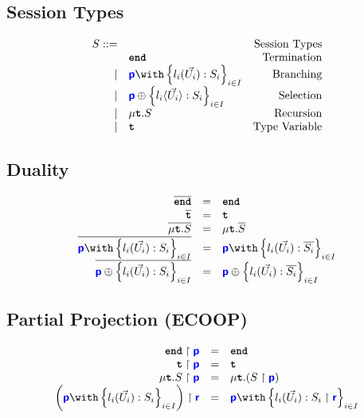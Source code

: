 \documentclass{article}
\begin{document}
\subsection{Session Types}

\doublespacing
\[
\begin{array}{rlr}
    S ::= & & \text{Session Types} \\
     & \tyend & \text{Termination} \\
		\mid & \tybra{p}{l_i(\vec{U_i}): S_i}{i \in I} & \text{Branching} \\
		\mid & \tysel{p}{l_i \langle\vec{U_i}\rangle: S_i}{i \in I} & \text{Selection} \\
		\mid & \tyrec{S} & \text{Recursion} \\
		\mid & \tyrecvar & \text{Type Variable} \\
\end{array}
\]
\singlespacing

\subsection{Duality}
\doublespacing
\[
\begin{array}{rcl}
		\dual{\tyend} & = & \tyend \\
		\dual{\tyrecvar} & = & \tyrecvar \\
		\dual{\tyrec{S}} & = & \tyrec{\dual{S}} \\
		\dual{\tybra{p}{l_i(\vec{U_i}): S_i}{i \in I}} & = & \tybra{p}{l_i(\vec{U_i}): \dual{S_i}}{i \in I} \\
		\dual{\tysel{p}{l_i(\vec{U_i}): S_i}{i \in I}} & = & \tysel{p}{l_i(\vec{U_i}): \dual{S_i}}{i \in I} \\
\end{array}
\]
\singlespacing

\subsection{Partial Projection (ECOOP)}
\doublespacing
\[
\begin{array}{rcl}
		\proj{\tyend}{p} & = & \tyend \\
		\proj{\tyrecvar}{p} & = & \tyrecvar \\
		\proj{\tyrec{S}}{p} & = & \tyrec{\left(\proj{S}{p}\right)} \\
		\proj{\left(\tybra{p}{l_i(\vec{U_i}): S_i}{i \in I}\right)}{r} & = & \tybra{p}{l_i(\vec{U_i}): \proj{S_i}{r}}{i \in I} \\
\end{array}
\]
\singlespacing
\end{document}
